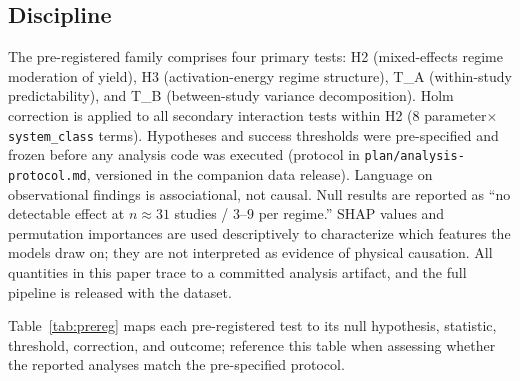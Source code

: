 \subsection{Discipline}

The pre-registered family comprises four primary tests: H2 (mixed-effects regime
moderation of yield), H3 (activation-energy regime structure), T\_A (within-study
predictability), and T\_B (between-study variance decomposition). Holm correction is
applied to all secondary interaction tests within H2 ($8$
parameter$\times$\texttt{system\_class} terms).
Hypotheses and success thresholds were pre-specified and frozen before any analysis code was executed
(protocol in \texttt{plan/analysis-protocol.md}, versioned in the companion data release). Language on
observational findings is associational, not causal. Null results are reported as ``no
detectable effect at $n\!\approx\!31$ studies / $3$--$9$ per regime.'' SHAP values and
permutation importances are used descriptively to characterize which features the models
draw on; they are not interpreted as evidence of physical causation. All quantities in
this paper trace to a committed analysis artifact, and the full pipeline is released
with the dataset.

Table~\ref{tab:prereg} maps each pre-registered test to its null hypothesis, statistic,
threshold, correction, and outcome; reference this table when assessing whether the
reported analyses match the pre-specified protocol.

